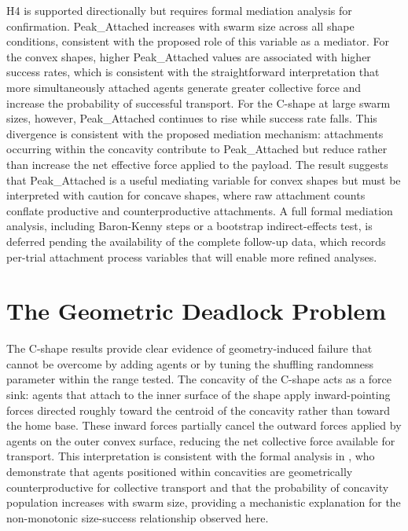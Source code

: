 H4 is supported directionally but requires formal mediation analysis for confirmation. Peak\_Attached increases with swarm size across all shape conditions, consistent with the proposed role of this variable as a mediator. For the convex shapes, higher Peak\_Attached values are associated with higher success rates, which is consistent with the straightforward interpretation that more simultaneously attached agents generate greater collective force and increase the probability of successful transport. For the C-shape at large swarm sizes, however, Peak\_Attached continues to rise while success rate falls. This divergence is consistent with the proposed mediation mechanism: attachments occurring within the concavity contribute to Peak\_Attached but reduce rather than increase the net effective force applied to the payload. The result suggests that Peak\_Attached is a useful mediating variable for convex shapes but must be interpreted with caution for concave shapes, where raw attachment counts conflate productive and counterproductive attachments. A full formal mediation analysis, including Baron-Kenny steps or a bootstrap indirect-effects test, is deferred pending the availability of the complete follow-up data, which records per-trial attachment process variables that will enable more refined analyses.

\section{The Geometric Deadlock Problem}
\label{sec:disc_deadlock}

The C-shape results provide clear evidence of geometry-induced failure that cannot be overcome by adding agents or by tuning the shuffling randomness parameter within the range tested. The concavity of the C-shape acts as a force sink: agents that attach to the inner surface of the shape apply inward-pointing forces directed roughly toward the centroid of the concavity rather than toward the home base. These inward forces partially cancel the outward forces applied by agents on the outer convex surface, reducing the net collective force available for transport. This interpretation is consistent with the formal analysis in \citet{arxiv2024concave}, who demonstrate that agents positioned within concavities are geometrically counterproductive for collective transport and that the probability of concavity population increases with swarm size, providing a mechanistic explanation for the non-monotonic size-success relationship observed here.

